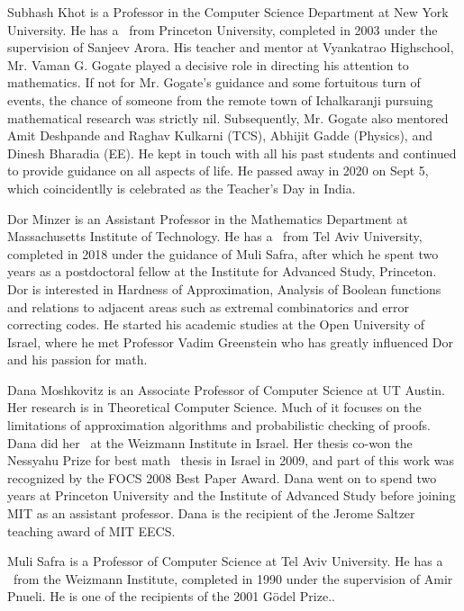\documentclass{toc}
\begin{document}
%
%
%
%
%
%
%
%
%
%
%
%
%
%
%
%
%
%
%
%
\begin{tocaboutauthors}
\begin{tocabout}[khot]  %
Subhash Khot is a Professor in the Computer Science Department at New York University. He has a \phd\ from Princeton University, completed in 2003 under the supervision of Sanjeev Arora.
His teacher and mentor at Vyankatrao Highschool, Mr. Vaman G. Gogate played a decisive role in directing his attention to mathematics. If not for Mr. Gogate’s guidance and some fortuitous turn of events, the chance of someone from the remote town of Ichalkaranji pursuing mathematical research was strictly nil. Subsequently, Mr. Gogate also mentored Amit Deshpande and Raghav Kulkarni (TCS), Abhijit Gadde (Physics), and Dinesh Bharadia (EE). He kept in touch with all his past students and continued to provide guidance on all aspects of life. He passed away in 2020 on Sept 5, which coincidentlly is celebrated as the Teacher's Day in India.
\end{tocabout}
\begin{tocabout}[minzer]
Dor Minzer is an Assistant Professor in the Mathematics Department at Massachusetts Institute of Technology.
He has a \phd\ from Tel Aviv University, completed in 2018 under the
guidance of Muli Safra, after which he spent two years as a %
postdoctoral  %
fellow at the Institute for Advanced Study, Princeton. Dor is interested in Hardness of Approximation,
Analysis of Boolean functions and relations to adjacent areas such as extremal combinatorics and error correcting codes.
He started his academic studies %
at  %
the Open University of Israel, %
where  %
he met Professor Vadim Greenstein %
who  %
has greatly influenced Dor and his passion for math.
\end{tocabout}
\begin{tocabout}[moshkovitz]
Dana Moshkovitz is an Associate Professor of Computer Science at UT Austin. Her research is in Theoretical Computer Science. Much of it focuses on the limitations of approximation algorithms and probabilistic checking of proofs. Dana did her
\phd\ at the Weizmann Institute in Israel. Her thesis co-won the Nessyahu Prize for best math \phd\ thesis in Israel in 2009, and part of this work was %
recognized by the FOCS 2008 Best Paper Award.   %
Dana went on to spend %
two  %
years at Princeton University and the Institute of Advanced Study before joining MIT as an assistant professor. Dana is the recipient of the Jerome Saltzer teaching award of MIT EECS.
\end{tocabout}
\begin{tocabout}[safra]
Muli Safra is a Professor of Computer Science at Tel Aviv University. He has a \phd\ from the Weizmann Institute, completed in 1990 under the supervision of Amir Pnueli. He is one of the recipients of the 2001 G\"{o}del Prize..
\end{tocabout}
\end{tocaboutauthors}
\end{document}
